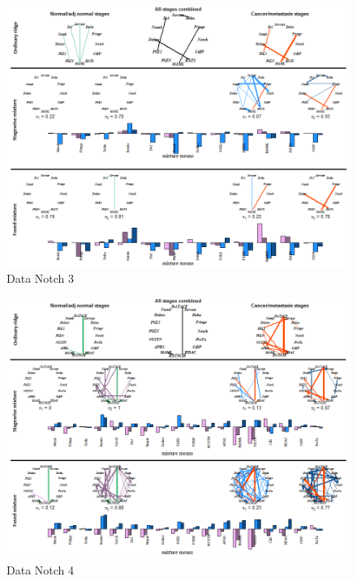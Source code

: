 \documentclass[10pt]{article}
\begin{document}
\newpage
\begin{figure}
\begin{center}
 \includegraphics[scale=.8]{notch3.png}
\end{center}
\caption{ Data Notch 3}
\label{fig:notch3}
\end{figure}


\begin{figure}
\begin{center}
 \includegraphics[scale=.8]{notch4.png}
\end{center}
\caption{ Data Notch 4}
\label{fig:notch4}
\end{figure}
\end{document}
